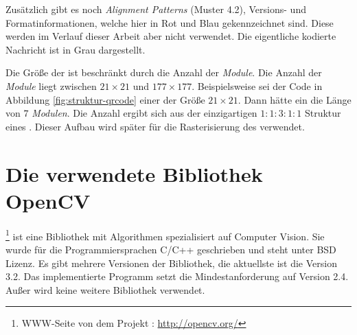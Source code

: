 Zusätzlich gibt es noch \emph{Alignment Patterns} (Muster 4.2), Versions- und Formatinformationen, welche hier in Rot und Blau gekennzeichnet sind. Diese werden im Verlauf dieser Arbeit aber nicht verwendet. Die eigentliche kodierte Nachricht ist in Grau dargestellt.

Die Größe der \QRCodes ist beschränkt durch die Anzahl der \emph{Module}. Die Anzahl der \emph{Module} liegt zwischen $21 \times 21$ und $177 \times 177$. Beispielsweise sei der Code in Abbildung \ref{fig:struktur-qrcode} einer der Größe $21 \times 21$. Dann hätte ein \emph{\fp} die Länge von $7$ \emph{Modulen}. Die Anzahl ergibt sich aus der einzigartigen $1:1:3:1:1$ Struktur eines \emph{\fps}. Dieser Aufbau wird später für die Rasterisierung des \QRCodes verwendet.

\section{Die verwendete Bibliothek OpenCV}
\OpenCV\footnote{WWW-Seite von dem Projekt \OpenCV: \url{http://opencv.org/}} ist eine Bibliothek mit Algorithmen spezialisiert auf \glqq Computer Vision\grqq . Sie wurde für die Programmiersprachen C/C++ geschrieben und steht unter BSD Lizenz. Es gibt mehrere Versionen der Bibliothek, die aktuellste ist die Version 3.2. Das implementierte Programm setzt die Mindestanforderung auf Version 2.4. Außer \OpenCV wird keine weitere Bibliothek verwendet.
